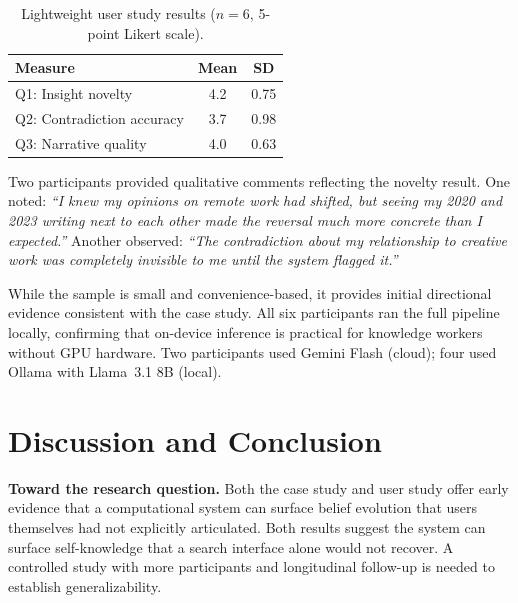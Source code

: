 \documentclass[conference]{IEEEtran}
\begin{document}
\begin{table}[t]
\caption{Lightweight user study results ($n{=}6$, 5-point Likert scale).}
\label{tab:userstudy}
\footnotesize
\begin{tabular}{lcc}
\toprule
\textbf{Measure} & \textbf{Mean} & \textbf{SD} \\
\midrule
Q1: Insight novelty   & 4.2 & 0.75 \\
Q2: Contradiction accuracy & 3.7 & 0.98 \\
Q3: Narrative quality & 4.0 & 0.63 \\
\bottomrule
\end{tabular}
\end{table}

Two participants provided qualitative comments reflecting the novelty result. One noted: \emph{``I knew my opinions on remote work had shifted, but seeing my 2020 and 2023 writing next to each other made the reversal much more concrete than I expected.''} Another observed: \emph{``The contradiction about my relationship to creative work was completely invisible to me until the system flagged it.''}

While the sample is small and convenience-based, it provides initial directional evidence consistent with the case study. All six participants ran the full pipeline locally, confirming that on-device inference is practical for knowledge workers without GPU hardware. Two participants used Gemini Flash (cloud); four used Ollama with Llama~3.1 8B (local).

\section{Discussion and Conclusion}
\label{sec:discussion}

\textbf{Toward the research question.} Both the case study and user study offer early evidence that a computational system can surface belief evolution that users themselves had not explicitly articulated. Both results suggest the system can surface self-knowledge that a search interface alone would not recover. A controlled study with more participants and longitudinal follow-up is needed to establish generalizability.
\end{document}
